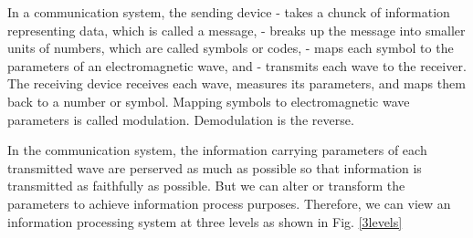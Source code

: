 \documentclass[oneside, letter, 12pt]{book}
\begin{document}
In a communication system, the sending device
- takes a chunck of information representing data, which is called a message,
- breaks up the message into smaller units of numbers, which are called symbols or codes,
- maps each symbol to the parameters of an electromagnetic wave, and
- transmits each wave to the receiver.
The receiving device receives each wave, measures its parameters, and maps them back to a number or symbol. 
Mapping symbols to electromagnetic wave parameters is called modulation. Demodulation is the reverse.

In the communication system, the information carrying parameters of each transmitted wave are perserved as much as possible so that information is transmitted as faithfully as possible. But we can alter or transform the parameters to achieve information process purposes. Therefore, we can view an information processing system at three levels as shown in Fig. \ref{3levels}
\end{document}
